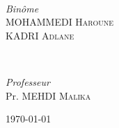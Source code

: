 \begin{titlepage}
	\HRule\\[1.5cm]


	\begin{minipage}{0.4\textwidth}
		\begin{flushleft}
			\large
			\textit{Binôme}\\
			MOHAMMEDI \textsc{Haroune}\\ 
			KADRI \textsc{Adlane} 
		\end{flushleft}
	\end{minipage}
	~
	\begin{minipage}{0.4\textwidth}
		\begin{flushright}
			\large
			\textit{Professeur}\\
			Pr. MEHDI \textsc{Malika} %
		\end{flushright}
	\end{minipage}


	\vfill\vfill\vfill %

	{\large\today} %


	\vfill %

\end{titlepage}
